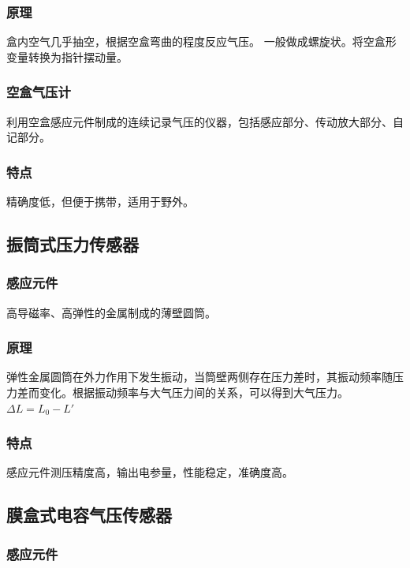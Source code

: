 \documentclass[UTF8,11pt]{ctexbook}
\begin{document}
\subsubsection{原理}

盒内空气几乎抽空，根据空盒弯曲的程度反应气压。 一般做成螺旋状。将空盒形变量转换为指针摆动量。

\subsubsection{空盒气压计}

利用空盒感应元件制成的连续记录气压的仪器，包括感应部分、传动放大部分、自记部分。

\subsubsection{特点}

精确度低，但便于携带，适用于野外。

\subsection{振筒式压力传感器}

\subsubsection{感应元件}

高导磁率、高弹性的金属制成的薄壁圆筒。

\subsubsection{原理}

弹性金属圆筒在外力作用下发生振动，当筒壁两侧存在压力差时，其振动频率随压力差而变化。根据振动频率与大气压力间的关系，可以得到大气压力。\(\Delta L=L_0-L'\)

\subsubsection{特点}

感应元件测压精度高，输出电参量，性能稳定，准确度高。

\subsection{膜盒式电容气压传感器}

\subsubsection{感应元件}
\end{document}
